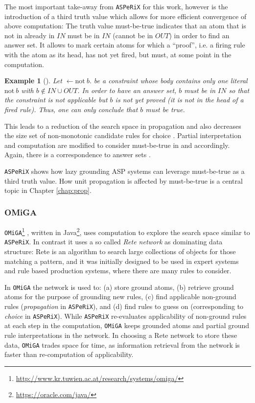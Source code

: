 \documentclass{vutinfth} %
\newtheorem{example}{Example}[chapter]
\newcommand{\mbt}{must-be-true\xspace}
\newcommand{\fail}{\mathrm{not } \ \xspace}
\newcommand{\from}{\ensuremath{\leftarrow}}
\newcommand{\asperix}{\texttt{ASPeRiX}\xspace}
\newcommand{\omiga}{\texttt{OMiGA}\xspace}
\begin{document}
The most important take-away from \asperix for this work, however is the introduction of a third truth value which allows for more efficient convergence of above computation: The truth value \mbt indicates that an atom that is not in already in $IN$ must be in $IN$ (cannot be in $OUT$) in order to find an answer set. It allows to mark certain atoms for which a \enquote{proof}, i.e. a firing rule with the atom as its head, has not yet fired, but must, at some point in the computation.

\begin{example}[{\cite[Example 7]{asperix}}]
\label{ex:mbt}
Let $\from \fail b.$ be a constraint whose body contains only one literal $\fail b$ with $b \not \in IN \cup OUT$. In order to have an answer set, $b$ must be in $IN$ so that the constraint is not applicable but $b$ is not yet proved (it is not in the head of a fired rule). Thus, one can only conclude that $b$ must be true.
\end{example}

This leads to a reduction of the search space in propagation \cite[Ex.~8]{asperix} and also decreases the size set of non-monotonic candidate rules for choice \cite[Ex.~9]{asperix}. Partial interpretation and computation are modified to consider \mbt in \cite[Def.~8]{asperix} and \cite[Def.~11]{asperix} accordingly. Again, there is a correspondence to answer sets \cite[Thm.~3]{asperix}.

\asperix shows how lazy grounding ASP systems can leverage \mbt as a third truth value. How unit propagation is affected by \mbt is a central topic in Chapter \ref{chap:prop}.

\subsubsection{OMiGA}
\label{sec:omiga}

\omiga\footnote{\url{http://www.kr.tuwien.ac.at/research/systems/omiga/}} \cite{omiga}, written in Java\footnote{\url{https://oracle.com/java/}}, uses computation to explore the search space similar to \asperix. In contrast it uses a so called \emph{Rete network} \cite{rete} as dominating data structure: Rete is an algorithm to search large collections of objects for those matching a pattern, and it was initially designed to be used in expert systems and rule based production systems, where there are many rules to consider.

In \omiga the network is used to: (a) store ground atoms, (b) retrieve ground atoms for the purpose of grounding new rules, (c) find applicable non-ground rules (\emph{propagation} in \asperix), and (d) find rules to guess on (corresponding to \emph{choice} in \asperix). While \asperix re-evaluates applicability of non-ground rules at each step in the computation, \omiga keeps grounded atoms and partial ground rule interpretations in the network. In choosing a Rete network to store these data, \omiga trades space for time, as information retrieval from the network is faster than re-computation of applicability. 
\end{document}
